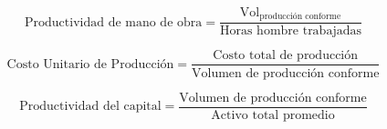 \begin{equation}\label{eq:productividad_mano_obra}
    \text{Productividad de mano de obra}=\frac{\text{Vol}_{\text{producción conforme}}}{\text{Horas hombre trabajadas}}
\end{equation}

\begin{equation}\label{eq:productividad_costo_unitario}
    \text{Costo Unitario de Producción} = \frac{\text{Costo total de producción}}{\text{Volumen de producción conforme}}
\end{equation}

\begin{equation}\label{eq:productividad_capital}
    \text{Productividad del capital} = \frac{\text{Volumen de producción conforme}}{\text{Activo total promedio}}
\end{equation}


